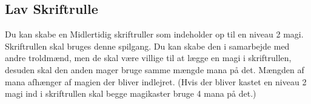 \subsection{Lav Skriftrulle}
Du kan skabe en Midlertidig skriftruller som indeholder op til en niveau 2 magi. Skriftrullen skal bruges denne spilgang. Du kan skabe den i samarbejde med andre troldmænd, men de skal være villige til at lægge en magi i skriftrullen, desuden skal den anden mager bruge samme mængde mana på det. Mængden af mana afhænger af magien der bliver indlejret. (Hvis der bliver kastet en niveau 2 magi ind i skriftrullen skal begge magikaster bruge 4 mana på det.)